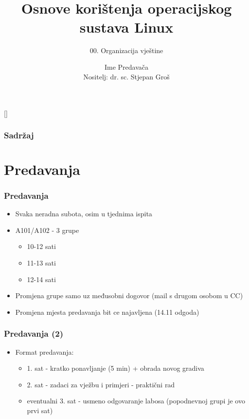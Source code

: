 \documentclass{beamer}
\title{Osnove korištenja operacijskog sustava Linux}
\subtitle{00. Organizacija vještine}
\author[Ime Predavača]{Ime Predavača\\{\small Nositelj: dr. sc. Stjepan Groš}}
\institute[FER]{Sveučilište u Zagrebu \\
				Fakultet elektrotehnike i računarstva}
\date{\todayiso}
\begin{document}
{
[] %

\begin{frame}
\maketitle
\end{frame}
}

\begin{frame}
\frametitle{Sadržaj}
\tableofcontents
\end{frame}

\section{Predavanja}
\begin{frame}[t]
\frametitle{Predavanja}
\begin{itemize}
	\item Svaka neradna subota, osim u tjednima ispita
	\item A101/A102 - 3 grupe 
	\begin{itemize}
    \item 10-12 sati
    \item 11-13 sati
    \item 12-14 sati
	\end{itemize}
\item Promjena grupe samo uz međusobni dogovor (mail s drugom osobom u CC)
\item Promjena mjesta predavanja bit ce najavljena (14.11 odgoda)
\end{itemize}
\end{frame}

\begin{frame}[t]
\frametitle{Predavanja (2)}
\begin{itemize}
	\item Format predavanja:
	\begin{itemize}
		\item 1. sat - kratko ponavljanje (5 min) + obrada novog gradiva
		\item 2. sat - zadaci za vježbu i primjeri - praktični rad
		\item eventualni 3. sat - usmeno odgovaranje labosa (popodnevnoj grupi je ovo prvi sat)
	\end{itemize}
\end{itemize}
\end{frame}
\end{document}

